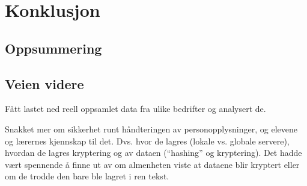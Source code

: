\section{Konklusjon}

\subsection{Oppsummering}

\subsection{Veien videre}

Fått lastet ned reell oppsamlet data fra ulike bedrifter og analysert de.

Snakket mer om sikkerhet runt håndteringen av personopplysninger, og elevene og lærernes kjennskap til det. Dvs. hvor de lagres (lokale vs. globale servere), hvordan de lagres kryptering og av dataen (``hashing'' og kryptering). Det hadde vært spennende å finne ut av om almenheten viste at dataene blir kryptert eller om de trodde den bare ble lagret i ren tekst.

\newpage
